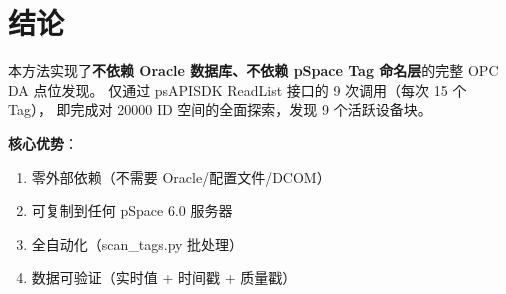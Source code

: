 \documentclass[12pt,a4paper]{ctexart}
\begin{document}
\section{结论}

本方法实现了\textbf{不依赖 Oracle 数据库、不依赖 pSpace Tag 命名层}的完整 OPC DA 点位发现。
仅通过 psAPISDK ReadList 接口的 9 次调用（每次 15 个 Tag），
即完成对 20000 ID 空间的全面探索，发现 9 个活跃设备块。

\textbf{核心优势}：
\begin{enumerate}[leftmargin=*]
  \item 零外部依赖（不需要 Oracle/配置文件/DCOM）
  \item 可复制到任何 pSpace 6.0 服务器
  \item 全自动化（scan\_tags.py 批处理）
  \item 数据可验证（实时值 + 时间戳 + 质量戳）
\end{enumerate}
\end{document}
